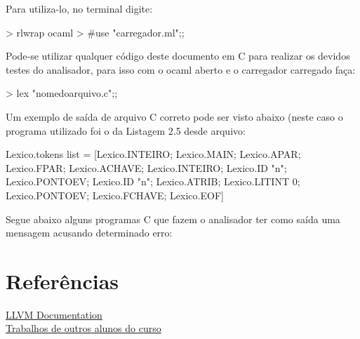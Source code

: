 \documentclass[12pt,a4paper,twoside]{report}
\begin{document}
Para utiliza-lo, no terminal digite:
\begin{terminal}
> rlwrap ocaml
> #use "carregador.ml";;
\end{terminal}

Pode-se utilizar qualquer código deste documento em C para realizar os devidos testes do analisador, para isso com o ocaml aberto e o carregador carregado faça:
\begin{terminal}
> lex "nomedoarquivo.c";;
\end{terminal}

Um exemplo de saída de arquivo C correto pode ser visto abaixo (neste caso o programa utilizado foi o da Listagem 2.5 desde arquivo:

Lexico.tokens list =
[Lexico.INTEIRO; Lexico.MAIN; Lexico.APAR; Lexico.FPAR; Lexico.ACHAVE;
 Lexico.INTEIRO; Lexico.ID "n"; Lexico.PONTOEV; Lexico.ID "n"; Lexico.ATRIB;
 Lexico.LITINT 0; Lexico.PONTOEV; Lexico.FCHAVE; Lexico.EOF]

Segue abaixo alguns programas C que fazem o analisador ter como saída uma mensagem acusando determinado erro:

\chapter{Referências}
\href{http://llvm.org/releases/3.3/docs/LangRef.html}{LLVM Documentation}\\
\href{https://groups.google.com/forum/#!forum/comp_ufu}{Trabalhos de outros alunos do curso}\\
  
\end{document}
